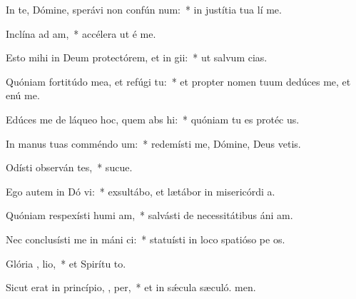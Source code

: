 \item In te, Dómine, sperávi non confún  num:~* in justítia tua lí me.
\item Inclína ad   am,~* accélera ut é me.
\item Esto mihi in Deum protectórem, et in  gii:~* ut salvum  cias.
\item Quóniam fortitúdo mea, et refúgi   tu:~* et propter nomen tuum dedúces me, et enú me.
\item Edúces me de láqueo hoc, quem abs hi:~* quóniam tu es protéc us.
\item In manus tuas comméndo  um:~* redemísti me, Dómine, Deus vetis.
\item Odísti observán tes,~* sucue.
\item Ego autem in Dó vi:~* exsultábo, et lætábor in misericórdi a.
\item Quóniam respexísti humi am,~* salvásti de necessitátibus áni am.
\item Nec conclusísti me in máni ci:~* statuísti in loco spatióso pe os.
\item Glória ,  lio,~* et Spirítu to.
\item Sicut erat in princípio,  ,  per,~* et in sǽcula sæculó. men.
